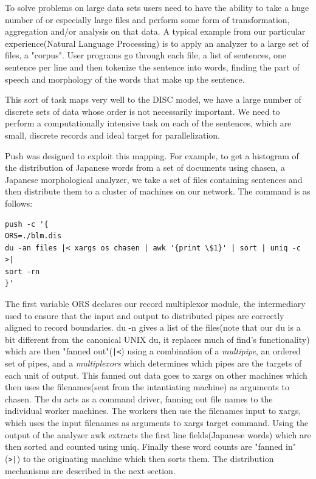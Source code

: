 \documentclass[11pt, letterpaper]{article}
\begin{document}
To solve problems on large data sets users need to have the ability to take a huge number of or especially large files and  perform some form of transformation, aggregation and/or analysis on that data.  A typical example from our particular experience(Natural Language Processing) is to apply an analyzer to a large set of files, a "corpus". User programs go through each file, a list of sentences, one sentence per line and then tokenize the sentence into words, finding the part of speech and morphology of the words that make up the sentence.

This sort of task maps very well to the DISC model, we have a large number of discrete sets of data whose order is not necessarily important. We need to perform a computationally intensive task on each of the sentences, which are small, discrete records and ideal target for parallelization. 

Push was designed to exploit this mapping. For example, to get a histogram of the distribution of Japanese words from a set of documents using chasen, a Japanese morphological analyzer, we take a set of files containing sentences and then distribute them to a cluster of machines on our network. The command is as follows:
\begin{verbatim}
push -c '{
ORS=./blm.dis
du -an files |< xargs os chasen | awk '{print \$1}' | sort | uniq -c >|
sort -rn
}'
\end{verbatim}

The first variable ORS declares our record multiplexor module, the intermediary used to ensure that the input and output to distributed pipes are correctly aligned to record boundaries. du -n gives a list of the files(note that our du is a bit different from the canonical UNIX du, it replaces much of find's functionality) which are then "fanned out"(\verb!|<!) using a combination of a \emph{multipipe}, an ordered set of pipes, and a \emph{multiplexors} which determines which pipes are the targets of each unit of output.  This fanned out data goes to xargs\cite{xargsman} on other machines which then uses the filenames(sent from the intantiating machine) as arguments to chasen. The du acts as a command driver, fanning out file names to the individual worker machines. The workers then use the filenames input to xargs, which uses the input filenames as arguments to xargs target command. Using the output of the analyzer awk extracts the first line fields(Japanese words) which are then sorted and counted using uniq.  Finally these word counts are "fanned in"(\verb!>|!) to the originating machine which then sorts them. The distribution mechanisms are described in the next section.
\end{document}
